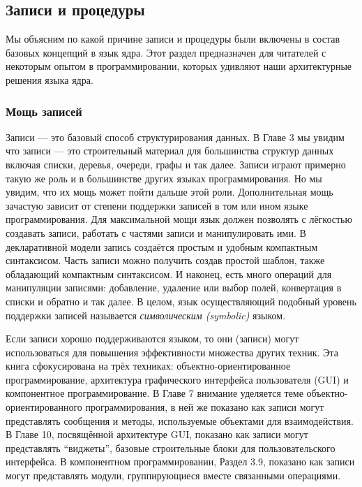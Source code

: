 \subsection{Записи и процедуры}

Мы объясним по какой причине записи и процедуры были включены в состав базовых концепций в язык ядра. Этот раздел предназначен для читателей с некоторым опытом в программировании, которых удивляют наши архитектурные решения языка ядра.

\subsubsection{Мощь записей}

Записи --- это базовый способ структурирования данных. В Главе 3 мы увидим что записи --- это строительный материал для большинства структур данных включая списки, деревья, очереди, графы и так далее. Записи играют примерно такую же роль и в большинстве других языках программирования. Но мы увидим, что их мощь может пойти дальше этой роли. Дополнительная мощь зачастую зависит от степени поддержки записей в том или ином языке программирования. Для максимальной мощи язык должен позволять с лёгкостью создавать записи, работать с частями записи и манипулировать ими. В декларативной модели запись создаётся простым и удобным компактным синтаксисом. Часть записи можно получить создав простой шаблон, также обладающий компактным синтаксисом. И наконец, есть много операций для манипуляции записями: добавление, удаление или выбор полей, конвертация в списки и обратно и так далее. В целом, язык осуществляющий подобный уровень поддержки записей называется \emph{символическим (symbolic)} языком.

Если записи хорошо поддерживаются языком, то они (записи) могут использоваться для повышения эффективности множества других техник. Эта книга сфокусирована на трёх техниках: объектно-ориентированное программирование, архитектура графического интерфейса пользователя (GUI) и компонентное программирование. В Главе 7 внимание уделяется теме объект\-но\--ориен\-ти\-ро\-ван\-но\-го программирования, в ней же показано как записи могут представлять сообщения и методы, используемые объектами для взаимодействия. В Главе 10, посвящённой архитектуре GUI, показано как записи могут представлять ``виджеты'', базовые строительные блоки для пользовательского интерфейса. В компонентном программировании, Раздел 3.9, показано как записи могут представлять модули, группирующиеся вместе связанными операциями.

